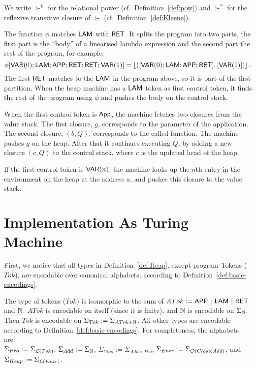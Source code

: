 We write $\succ^k$ for the relational power (cf.\ Definition~\ref{def:pow}) and $\succ^*$ for the reflexive transitive closure of $\succ$ (cf.\
Definition~\ref{def:Kleene}).

The function $\phi$ matches $\mathsf{LAM}$ with $\mathsf{RET}$.  It splits the program into two parts, the first part is the ``body'' of a linearised lambda
expression and the second part the rest of the program, for example:%
{\small
  \[
    \phi[\mathsf{VAR}(0); \mathsf{LAM}; \mathsf{APP}; \mathsf{RET}; \mathsf{RET}; \mathsf{VAR}(1)] = \left\lfloor {([\ensuremath{\mathsf{VAR}}(0); \ensuremath{\mathsf{LAM}}; \ensuremath{\mathsf{APP}}; \ensuremath{\mathsf{RET}}], [\ensuremath{\mathsf{VAR}}(1)])} \right\rfloor.
  \]
}%
The first $\mathsf{RET}$ matches to the $\mathsf{LAM}$ in the program above, so it is part of the first partition.  When the heap machine has a $\mathsf{LAM}$
token as first control token, it finds the rest of the program using $\phi$ and pushes the body on the control stack.

When the first control token is $\mathsf{App}$, the machine fetches two closures from the value stack.  The first closure, $g$, corresponds to the
parameter of the application.  The second closure, $(b,Q)$, corresponds to the called function.  The machine pushes $g$ on the heap.  After that it
continues executing $Q$, by adding a new closure $(c,Q)$ to the control stack, where $c$ is the updated head of the heap.

If the first control token is $\mathsf{VAR}(n)$, the machine looks up the $n$th entry in the environment on the heap at the address $a$, and pushes this
closure to the value stack.


\section{Implementation As Turing Machine}
\label{sec:heap-implementation}

First, we notice that all types in Definition~\ref{def:Heap}, except program Tokens ($Tok$), are encodable over canonical alphabets, according to
Definition~\ref{def:basic-encodings}.
\begin{definition}
  \label{def:Heap-encode}
  The type of tokens ($Tok$) is isomorphic to the sum of $ATok := \mathsf{APP} ~|~ \mathsf{LAM} ~|~ \mathsf{RET}$ and $\mathbb{N}$.  $ATok$ is encodable on itself
  (since it is finite), and $\mathbb{N}$ is encodable on $\Sigma_{\mathbb{N}}$.  Then $Tok$ is encodable on $\Sigma_{Tok} := \Sigma_{ATok+\mathbb{N}}$.
  All other types are encodable according to Definition~\ref{def:basic-encodings}.  For completeness, the alphabets are:\\
  $\Sigma_{Pro} := \Sigma_{\mathcal{L}(Tok)}$, $\Sigma_{Add} := \Sigma_{\mathbb{N}}$, $\Sigma_{Clos}:=\Sigma_{Add \times Pro}$,
  $\Sigma_{Entr} := \Sigma_{\mathcal{O}(Clos \times Add)}$, and $\Sigma_{Heap} := \Sigma_{\mathcal{L}(Entr)}$.
\end{definition}

